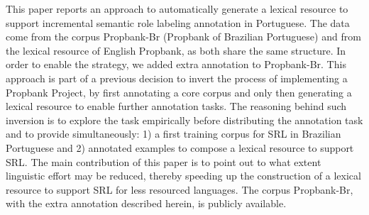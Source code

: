This paper reports an approach to automatically generate a lexical resource to support incremental semantic role labeling annotation in Portuguese. The data come from the corpus Propbank-Br (Propbank of Brazilian Portuguese) and from the lexical resource of English Propbank, as both share the same structure.  In order to enable the strategy, we added extra annotation to Propbank-Br. This approach is part of a previous decision to invert the process of implementing a Propbank Project, by first annotating a core corpus and only then generating a lexical resource to enable further annotation tasks. The reasoning behind such inversion is to explore the task empirically before distributing the annotation task and to provide simultaneously: 1) a first training corpus for SRL in Brazilian Portuguese and 2) annotated examples to compose a lexical resource to support SRL. The main contribution of this paper is to point out to what extent linguistic effort may be reduced, thereby speeding up the construction of a lexical resource to support SRL for less resourced languages. The corpus Propbank-Br, with the extra annotation described herein, is publicly available.
